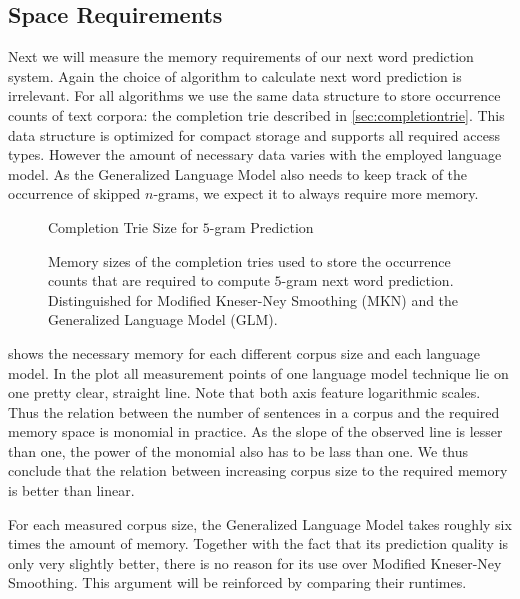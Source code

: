 \subsection{Space Requirements}
\label{subsec:evaluation-topkjoin-space}

Next we will measure the memory requirements of our next word prediction
system.
Again the choice of algorithm to calculate next word prediction is irrelevant.
For all algorithms we use the same data structure to store occurrence counts of
text corpora: the completion trie described in \cref{sec:completiontrie}.
This data structure is optimized for compact storage and supports all required
access types.
However the amount of necessary data varies with the employed language model.
As the Generalized Language Model also needs to keep track of the occurrence
of skipped $n$-grams, we expect it to always require more memory.

\begin{figure}
  \centering
  Completion Trie Size for $5$-gram Prediction
  \\[1.5ex]
  \begin{minipage}{0.7\textwidth}
    \centering
    
  \end{minipage}
  \caption{Memory sizes of the completion tries used to store the occurrence
    counts that are required to compute $5$-gram next word prediction.
    Distinguished for Modified Kneser-Ney Smoothing (MKN) and the Generalized
    Language Model (GLM).}
  \label{fig:evaluation-trie-size}
\end{figure}

 shows the necessary memory for each different
corpus size and each language model.
In the plot all measurement points of one language model technique lie on one
pretty clear, straight line.
Note that both axis feature logarithmic scales.
Thus the relation between the number of sentences in a corpus and the required
memory space is monomial in practice.
As the slope of the observed line is lesser than one, the power of the monomial
also has to be lass than one.
We thus conclude that the relation between increasing corpus size to the
required memory is better than linear.

For each measured corpus size, the Generalized Language Model takes roughly
six times the amount of memory.
Together with the fact that its prediction quality is only very slightly better,
there is no reason for its use over Modified Kneser-Ney Smoothing.
This argument will be reinforced by comparing their runtimes.

